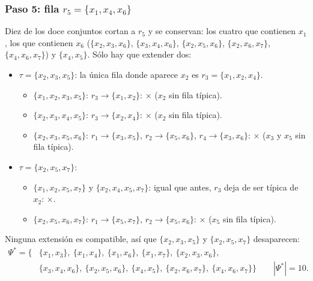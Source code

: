 \documentclass[11pt, a4paper]{article}
\theoremstyle{definition}
\theoremstyle{plain}
\newcommand{\Psis}{\Psi^{*}}
\newcommand{\x}[1]{x_{#1}}
\newcommand{\cj}[1]{\{#1\}}
\newcommand{\no}{\textcolor{red!70!black}{\ensuremath{\times}}}
\begin{document}
\subsubsection*{Paso 5: fila $r_5=\cj{\x1,\x4,\x6}$}
Diez de los doce conjuntos cortan a $r_5$ y se conservan: los cuatro que contienen
$\x1$, los que contienen $\x6$ ($\cj{\x2,\x3,\x6}$, $\cj{\x3,\x4,\x6}$, $\cj{\x2,\x5,\x6}$,
$\cj{\x2,\x6,\x7}$, $\cj{\x4,\x6,\x7}$) y $\cj{\x4,\x5}$. Sólo hay que extender dos:
\begin{itemize}[nosep]
\item $\tau=\cj{\x2,\x3,\x5}$: la única fila donde aparece $\x2$ es $r_3=\cj{\x1,\x2,\x4}$.
  \begin{itemize}[nosep]
  \item $\cj{\x1,\x2,\x3,\x5}$: $r_3\to\cj{\x1,\x2}$: \no{} ($\x2$ sin fila típica).
  \item $\cj{\x2,\x3,\x4,\x5}$: $r_3\to\cj{\x2,\x4}$: \no{} ($\x2$ sin fila típica).
  \item $\cj{\x2,\x3,\x5,\x6}$: $r_1\to\cj{\x3,\x5}$, $r_2\to\cj{\x5,\x6}$, $r_4\to\cj{\x3,\x6}$: \no{} ($\x3$ y $\x5$ sin fila típica).
  \end{itemize}
\item $\tau=\cj{\x2,\x5,\x7}$:
  \begin{itemize}[nosep]
  \item $\cj{\x1,\x2,\x5,\x7}$ y $\cj{\x2,\x4,\x5,\x7}$: igual que antes, $r_3$ deja de ser típica de $\x2$: \no.
  \item $\cj{\x2,\x5,\x6,\x7}$: $r_1\to\cj{\x5,\x7}$, $r_2\to\cj{\x5,\x6}$: \no{} ($\x5$ sin fila típica).
  \end{itemize}
\end{itemize}
Ninguna extensión es compatible, así que $\cj{\x2,\x3,\x5}$ y $\cj{\x2,\x5,\x7}$ desaparecen:
\[
\begin{aligned}
\Psis=\big\{&\cj{\x1,\x3},\ \cj{\x1,\x4},\ \cj{\x1,\x6},\ \cj{\x1,\x7},\ \cj{\x2,\x3,\x6},\\
&\cj{\x3,\x4,\x6},\ \cj{\x2,\x5,\x6},\ \cj{\x4,\x5},\ \cj{\x2,\x6,\x7},\ \cj{\x4,\x6,\x7}\big\}\qquad |\Psis|=10.
\end{aligned}
\]
\end{document}
